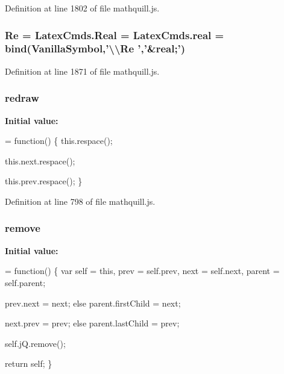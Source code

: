 Definition at line 1802 of file mathquill.\-js.

\subsubsection[{Re}]{ Re = Latex\-Cmds.\-Real = Latex\-Cmds.\-real = {\bf bind}({\bf Vanilla\-Symbol},'\textbackslash{}\textbackslash{}Re ','\&real;')}\label{mathquill_8js_adc649a7e6c3cc90619a53faab534848f}


Definition at line 1871 of file mathquill.\-js.

\subsubsection[{redraw}]{\setlength{\rightskip}{0pt plus 5cm}{\bf \-\_\-} redraw}\label{mathquill_8js_a07f4e70adf3b108071b2ce6e8c641c09}
{\bfseries Initial value\-:}
\begin{DoxyCode}
= \textcolor{keyword}{function}() \{
  this.respace();

    this.next.respace();

    this.prev.respace();
\}
\end{DoxyCode}


Definition at line 798 of file mathquill.\-js.

\subsubsection[{remove}]{\setlength{\rightskip}{0pt plus 5cm}{\bf \-\_\-} remove}\label{mathquill_8js_ac26b10105aa7b26b9efdb4532414b8a9}
{\bfseries Initial value\-:}
\begin{DoxyCode}
= \textcolor{keyword}{function}() \{
  var \textcolor{keyword}{self} = \textcolor{keyword}{this},
      prev = \textcolor{keyword}{self}.prev,
      next = \textcolor{keyword}{self}.next,
      parent = \textcolor{keyword}{self}.parent;


    prev.next = next;
  \textcolor{keywordflow}{else}
    parent.firstChild = next;


    next.prev = prev;
  \textcolor{keywordflow}{else}
    parent.lastChild = prev;

  \textcolor{keyword}{self}.jQ.remove();

  \textcolor{keywordflow}{return} \textcolor{keyword}{self};
\}
\end{DoxyCode}


